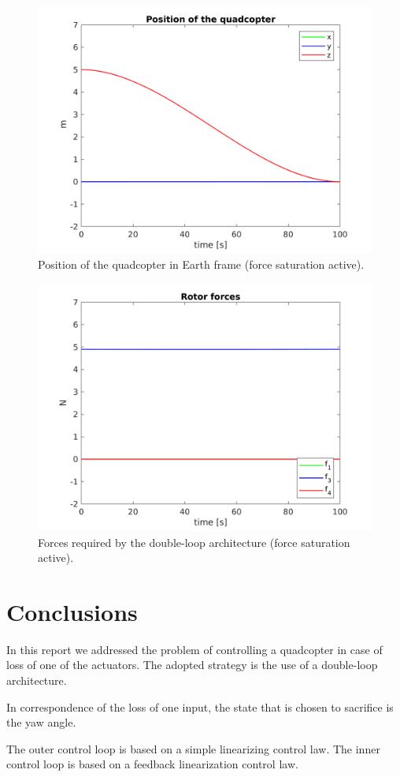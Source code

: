 \documentclass[11pt,a4paper]{scrartcl}
\begin{document}
\begin{figure}[H]
	\centering
	\includegraphics[width=0.7\linewidth]{Images/Position_SetPoint}
	\caption{Position of the quadcopter in Earth frame (force saturation active).}
	\label{fig:positionsetpoint}
\end{figure}

\begin{figure}
	\centering
	\includegraphics[width=0.7\linewidth]{Images/Forces_SetPoint}
	\caption{Forces required by the double-loop architecture (force saturation active).}
	\label{fig:forcessetpoint}
\end{figure}

\section{Conclusions}

In this report we addressed the problem of controlling a quadcopter in case of loss of one of the actuators. The adopted strategy is the use of a double-loop architecture. 

In correspondence of the loss of one input, the state that is chosen to sacrifice is the yaw angle.

The outer control loop is based on a simple linearizing control law. The inner control loop is based on a feedback linearization control law. 
\end{document}
